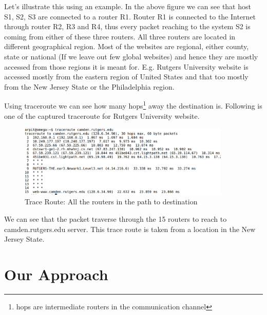 \documentclass[12pt,oneside,a4paper]{article}
\begin{document}
Let's illustrate this using an example. In the above figure we can see that host S1, S2, S3 are connected to a router R1. Router R1 is connected to the Internet through router R2, R3 and R4, thus every packet reaching to the system S2 is coming from either of these three routers. All three routers are located in different geographical region. Most of the websites are regional, either county, state or national (If we leave out few global websites) and hence they are mostly accessed from those regions it is meant for. E.g. Rutgers University website is accessed mostly from the eastern region of United States and that too mostly from the New Jersey State or the Philadelphia region.\par
Using traceroute we can see how many hops\footnote{hops are intermediate routers in the communication channel} away the destination is. Following is one of the captured traceroute for Rutgers University website.\par
\begin{figure}[H]
\centering
\includegraphics[width=0.90\textwidth]{TraceRoute.png}
\caption{Trace Route: All the routers in the path to destination} \label{fig:traceroute}
\end{figure}

We can see that the packet traverse through the 15 routers to reach to camden.rutgers.edu server. This trace route is taken from a location in the New Jersey State.\par
\pagebreak
\section{Our Approach}
\end{document}

